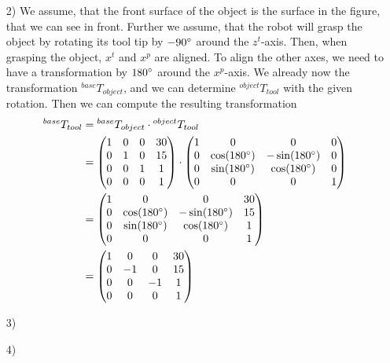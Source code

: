 \documentclass[a4paper,11pt]{article}
\begin{document}
\begin {enumerate}
\begin{enumerate}
        \item[2)]
        We assume, that the front surface of the object is the surface in the figure, that we can see in front. Further we assume, that the robot will grasp the object by rotating its tool tip by $-90\degree$ around the $z^t$-axis. Then, when grasping the object, $x^t$ and $x^p$ are aligned. To align the other axes, we need to have a transformation by $180\degree$ around the $x^p$-axis. We already now the transformation ${^{base}T_{object}}$, and we can determine ${^{object}T_{tool}}$ with the given rotation. Then we can compute the resulting transformation
        \begin{align*}
          {^{base}T_{tool}} &= {^{base}T_{object}} \cdot {^{object}T_{tool}}\\
          &= \begin{pmatrix}
            1 & 0 & 0 & 30\\
            0 & 1 & 0 & 15\\
            0 & 0 & 1 & 1\\
            0 & 0 & 0 & 1
          \end{pmatrix} \cdot \begin{pmatrix}
            1 & 0 & 0 & 0\\
            0 & \cos(180\degree) & -\sin(180\degree) & 0\\
            0 & \sin(180\degree) & \cos(180\degree) & 0\\
            0 & 0 & 0 & 1
          \end{pmatrix}\\
          &= \begin{pmatrix}
            1 & 0 & 0 & 30\\
            0 & \cos(180\degree) & -\sin(180\degree) & 15\\
            0 & \sin(180\degree) & \cos(180\degree) & 1\\
            0 & 0 & 0 & 1
          \end{pmatrix}\\
          &= \begin{pmatrix}
            1 & 0 & 0 & 30\\
            0 & -1 & 0 & 15\\
            0 & 0 & -1 & 1\\
            0 & 0 & 0 & 1
          \end{pmatrix}
        \end{align*}



        \item[3)]



        \item[4)]
    \end{enumerate}

\end {enumerate}
\end{document}
